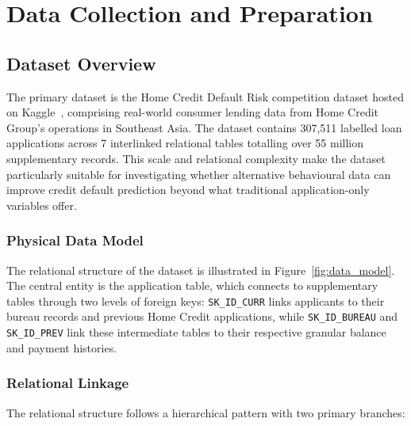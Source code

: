 \chapter{Data Collection and Preparation}
\label{chap:data}

\section{Dataset Overview}
\label{sec:dataset_overview}

The primary dataset is the Home Credit Default Risk competition dataset hosted on Kaggle~\cite{kaggle2018}, comprising real-world consumer lending data from Home Credit Group's operations in Southeast Asia. The dataset contains 307,511 labelled loan applications across 7 interlinked relational tables totalling over 55 million supplementary records. This scale and relational complexity make the dataset particularly suitable for investigating whether alternative behavioural data can improve credit default prediction beyond what traditional application-only variables offer.

\subsection{Physical Data Model}

The relational structure of the dataset is illustrated in Figure~\ref{fig:data_model}. The central entity is the application table, which connects to supplementary tables through two levels of foreign keys: \texttt{SK\_ID\_CURR} links applicants to their bureau records and previous Home Credit applications, while \texttt{SK\_ID\_BUREAU} and \texttt{SK\_ID\_PREV} link these intermediate tables to their respective granular balance and payment histories.



\subsection{Relational Linkage}

The relational structure follows a hierarchical pattern with two primary branches:

